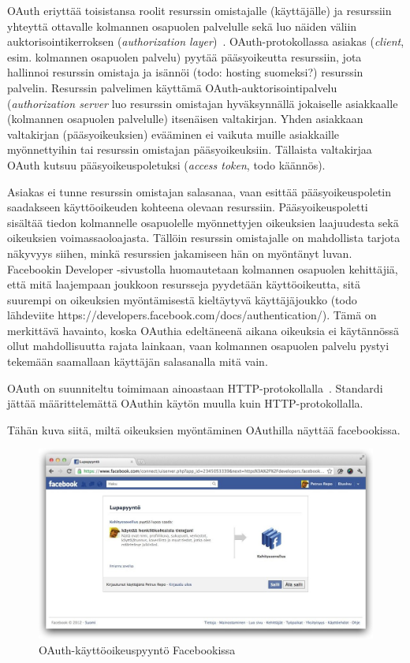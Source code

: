 \documentclass[finnish,gradu]{tktltiki}
\begin{document}
  OAuth eriyttää toisistansa roolit resurssin omistajalle (käyttäjälle) ja resurssiin yhteyttä ottavalle kolmannen osapuolen palvelulle sekä luo näiden väliin auktorisointikerroksen (\emph{authorization layer})~\cite{ietf_oauth2}. OAuth-protokollassa asiakas (\emph{client}, esim. kolmannen osapuolen palvelu) pyytää pääsyoikeutta resurssiin, jota hallinnoi resurssin omistaja ja isännöi (todo: hosting suomeksi?) resurssin palvelin. Resurssin palvelimen käyttämä OAuth-auktorisointipalvelu (\emph{authorization server} luo resurssin omistajan hyväksynnällä jokaiselle asiakkaalle (kolmannen osapuolen palvelulle) itsenäisen valtakirjan. Yhden asiakkaan valtakirjan (pääsyoikeuksien) evääminen ei vaikuta muille asiakkaille myönnettyihin tai resurssin omistajan pääsyoikeuksiin. Tällaista valtakirjaa OAuth kutsuu pääsyoikeuspoletuksi (\emph{access token}, todo käännös).

  Asiakas ei tunne resurssin omistajan salasanaa, vaan esittää pääsyoikeuspoletin saadakseen käyttöoikeuden kohteena olevaan resurssiin. Pääsyoikeuspoletti sisältää tiedon kolmannelle osapuolelle myönnettyjen oikeuksien laajuudesta sekä oikeuksien voimassaoloajasta. Tällöin resurssin omistajalle on mahdollista tarjota näkyvyys siihen, minkä resurssien jakamiseen hän on myöntänyt luvan. Facebookin Developer -sivustolla huomautetaan kolmannen osapuolen kehittäjiä, että mitä laajempaan joukkoon resursseja pyydetään käyttöoikeutta, sitä suurempi on oikeuksien myöntämisestä kieltäytyvä käyttäjäjoukko (todo lähdeviite https://developers.facebook.com/docs/authentication/). Tämä on merkittävä havainto, koska OAuthia edeltäneenä aikana oikeuksia ei käytännössä ollut mahdollisuutta rajata lainkaan, vaan kolmannen osapuolen palvelu pystyi tekemään saamallaan käyttäjän salasanalla mitä vain.

  OAuth on suunniteltu toimimaan ainoastaan HTTP-protokollalla~\cite{ietf_oauth2}.
  Standardi jättää määrittelemättä OAuthin käytön muulla kuin HTTP-protokollalla.

  Tähän kuva siitä, miltä oikeuksien myöntäminen OAuthilla näyttää facebookissa.
  \begin{figure}
    \centering
    \includegraphics[width=1.0\textwidth]{images/facebook_oauth_lupapyynto.jpg}
    \caption{OAuth-käyttöoikeuspyyntö Facebookissa}
    \label{fig:facebook_oauth_lupapyynto}
  \end{figure}
\end{document}

